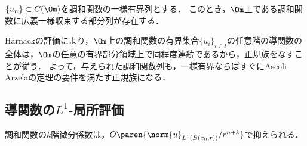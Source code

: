 \documentclass[uplatex,dvipdfmx]{jsreport}
\begin{document}
\begin{corollary}[一様有界列は相対コンパクト]\label{cor-Harnack-Linfty-evaluation}
    $\{u_n\}\subset C(\Om)$を調和関数の一様有界列とする．
    このとき，$\Om$上である調和関数に広義一様収束する部分列が存在する．
\end{corollary}
\begin{Proof}
    Harnackの評価により，$\Om$上の調和関数の有界集合$\{u_i\}_{i\in I}$の任意階の導関数の全体は，$\Om$の任意の有界部分領域上で同程度連続であるから，正規族をなすことが従う．
    よって，与えられた調和関数列も，一様有界ならばすぐにAscoli-Arzelaの定理の要件を満たす正規族になる．
\end{Proof}

\subsection{導関数の$L^1$-局所評価}

\begin{tcolorbox}[colframe=ForestGreen, colback=ForestGreen!10!white,breakable,colbacktitle=ForestGreen!40!white,coltitle=black,fonttitle=\bfseries\sffamily,
title=]
    調和関数の$k$階微分係数は，$O\paren{\norm{u}_{L^1(B(x_0,r))}/r^{n+k}}$で抑えられる．
\end{tcolorbox}
\end{document}
